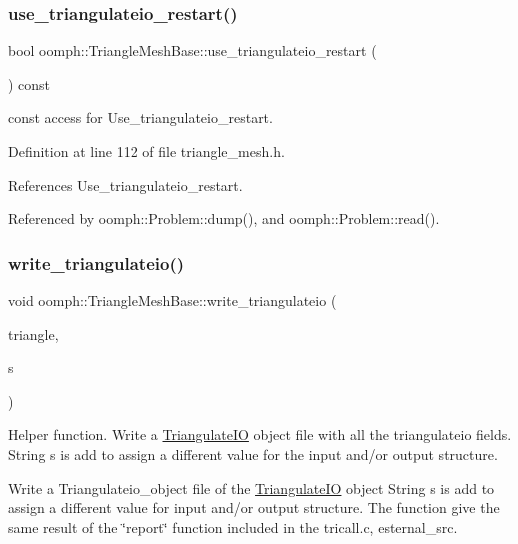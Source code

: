 \subsubsection{\texorpdfstring{use\+\_\+triangulateio\+\_\+restart()}{use\_triangulateio\_restart()}}
{\footnotesize\ttfamily bool oomph\+::\+Triangle\+Mesh\+Base\+::use\+\_\+triangulateio\+\_\+restart (\begin{DoxyParamCaption}{ }\end{DoxyParamCaption}) const\hspace{0.3cm}{\ttfamily [inline]}}



const access for Use\+\_\+triangulateio\+\_\+restart. 



Definition at line 112 of file triangle\+\_\+mesh.\+h.



References Use\+\_\+triangulateio\+\_\+restart.



Referenced by oomph\+::\+Problem\+::dump(), and oomph\+::\+Problem\+::read().

\mbox{\label{classoomph_1_1TriangleMeshBase_ac6bf9ce6546b2e853c3c84cd44837c31}} 
\subsubsection{\texorpdfstring{write\+\_\+triangulateio()}{write\_triangulateio()}}
{\footnotesize\ttfamily void oomph\+::\+Triangle\+Mesh\+Base\+::write\+\_\+triangulateio (\begin{DoxyParamCaption}\item[{\hyperlink{structoomph_1_1TriangulateIO}{Triangulate\+IO} \&}]{triangle,  }\item[{std\+::string \&}]{s }\end{DoxyParamCaption})}



Helper function. Write a \hyperlink{structoomph_1_1TriangulateIO}{Triangulate\+IO} object file with all the triangulateio fields. String s is add to assign a different value for the input and/or output structure. 

Write a Triangulateio\+\_\+object file of the \hyperlink{structoomph_1_1TriangulateIO}{Triangulate\+IO} object String s is add to assign a different value for input and/or output structure. The function give the same result of the \char`\"{}report\char`\"{} function included in the tricall.\+c, esternal\+\_\+src. 

